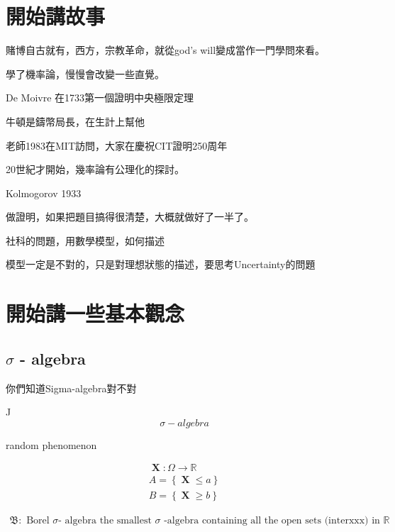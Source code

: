 \documentclass[UTF8,a4paper,14pt]{ctexart}
\DeclareMathOperator{\X}{\mathbf{X}}
\theoremstyle{definition}
\theoremstyle{remark}
\begin{document}
\section{開始講故事}

賭博自古就有，西方，宗教革命，就從god's will變成當作一門學問來看。

學了機率論，慢慢會改變一些直覺。

De Moivre 在1733第一個證明中央極限定理

牛頓是鑄幣局長，在生計上幫他

老師1983在MIT訪問，大家在慶祝CIT證明250周年

20世紀才開始，幾率論有公理化的探討。

Kolmogorov 1933

做證明，如果把題目搞得很清楚，大概就做好了一半了。

社科的問題，用數學模型，如何描述

模型一定是不對的，只是對理想狀態的描述，要思考Uncertainty的問題

\section{開始講一些基本觀念}
\subsection{$\sigma$ - algebra}
你們知道Sigma-algebra對不對

^^

\begin{equation}
  \sigma - algebra
\end{equation}

random phenomenon

\begin{equation}
  \begin{aligned}
    \X: \Omega \rightarrow \mathbb{R} \\
    A=\left\{\X\leq a\right\} \\
    B=\left\{\X\geq b\right\}    
  \end{aligned}
\end{equation}

\begin{equation}
  \begin{aligned}
    \mathfrak{B} :\text{ Borel $\sigma$- algebra
    the smallest  $\sigma$ -algebra
    containing all the open sets (interxxx) in $\mathbb{R}$}
  \end{aligned}
\end{equation}
\end{document}
